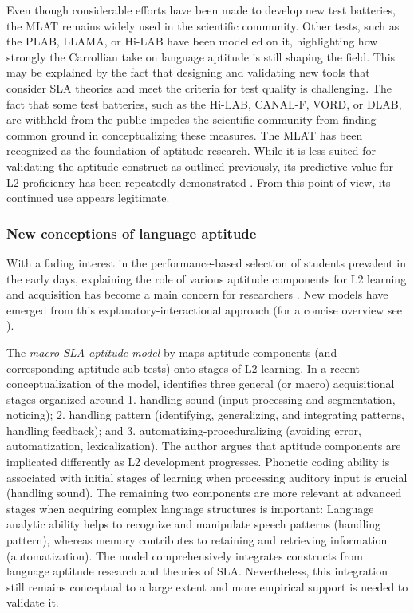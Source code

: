 \documentclass[output=paper]{langscibook}
\begin{document}
Even though considerable efforts have been made to develop new test batteries, the MLAT remains widely used in the scientific community. Other tests, such as the PLAB, LLAMA, or Hi-LAB have been modelled on it, highlighting how strongly the Carrollian take on language aptitude is still shaping the field. This may be explained by the fact that designing and validating new tools that consider SLA theories and meet the criteria for test quality is challenging. The fact that some test batteries, such as the Hi-LAB, CANAL-F, VORD, or DLAB, are withheld from the public \citep{AmeringerEtAl2019} impedes the scientific community from finding common ground in conceptualizing these measures. The MLAT has been recognized as the foundation of aptitude research. While it is less suited for validating the aptitude construct as outlined previously, its predictive value for L2 proficiency has been repeatedly demonstrated \citep{Li2016}. From this point of view, its continued use appears legitimate.

\subsubsection{New conceptions of language aptitude} %

With a fading interest in the performance-based selection of students prevalent in the early days, explaining the role of various aptitude components for L2 learning and acquisition has become a main concern for researchers \citep{Li2019}. New models have emerged from this explanatory-interactional approach (for a concise overview see \citealt{WenEtAl2017}).

The \textit{macro-SLA aptitude model} by \citet{Skehan2002, Skehan2019} maps aptitude components (and corresponding aptitude sub-tests) onto stages of L2 learning. In a recent conceptualization of the model, \citet{Skehan2019} identifies three general (or macro) acquisitional stages organized around 1. handling sound (input processing and segmentation, noticing); 2. handling pattern (identifying, generalizing, and integrating patterns, handling feedback); and 3. automatizing-pro\-ce\-du\-ra\-liz\-ing (avoiding error, automatization, lexicalization). The author argues that aptitude components are implicated differently as L2 development progresses. Phonetic coding ability is associated with initial stages of learning when processing auditory input is crucial (handling sound). The remaining two components are more relevant at advanced stages when acquiring complex language structures is important: Language analytic ability helps to recognize and manipulate speech patterns (handling pattern), whereas memory contributes to retaining and retrieving information (automatization). The model comprehensively integrates constructs from language aptitude research and theories of SLA. Nevertheless, this integration still remains conceptual to a large extent and more empirical support is needed to validate it. 
\end{document}
